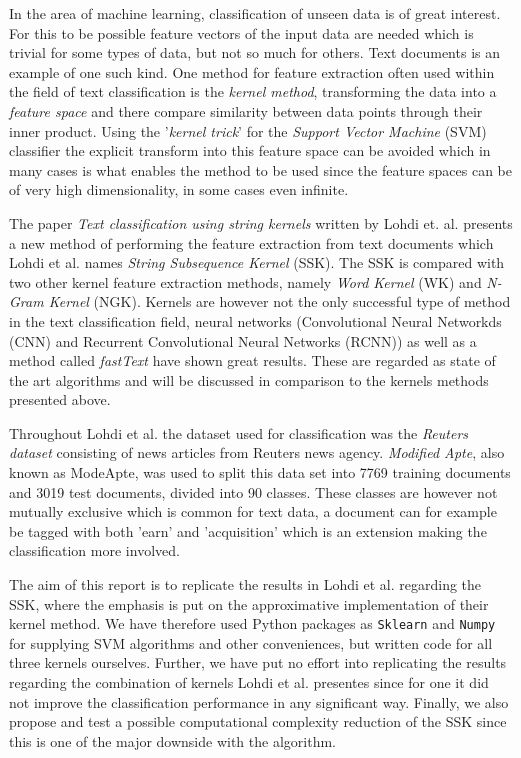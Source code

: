 
In the area of machine learning, classification of unseen data is of great interest. For this to be possible feature vectors of the input data are needed which is trivial for some types of data, but not so much for others. Text documents is an example of one such kind. One method for feature extraction often used within the field of text classification is the \textit{kernel method}, transforming the data into a \textit{feature space} and there compare similarity between data points through their inner product. Using the '\textit{kernel trick}' for the \textit{Support Vector Machine} (SVM) classifier the explicit transform into this feature space can be avoided which in many cases is what enables the method to be used since the feature spaces can be of very high dimensionality, in some cases even infinite. 

The paper \textit{Text classification using string kernels} written by Lohdi et. al. presents a new method of performing the feature extraction from text documents which Lohdi et al. names \textit{String Subsequence Kernel} (SSK). The SSK is compared with two other kernel feature extraction methods, namely \textit{Word Kernel} (WK) and \textit{N-Gram Kernel} (NGK). Kernels are however not the only successful type of method in the text classification field, neural networks (Convolutional Neural Networkds (CNN) and Recurrent Convolutional Neural Networks (RCNN)) as well as a method called \textit{fastText} have shown great results. These are regarded as state of the art algorithms and will be discussed in comparison to the kernels methods presented above. 

Throughout Lohdi et al. the dataset used for classification was the \textit{Reuters dataset} consisting of news articles from Reuters news agency. \textit{Modified Apte}, also known as ModeApte, was used to split this data set into 7769 training documents and 3019 test documents, divided into 90 classes. These classes are however not mutually exclusive which is common for text data, a document can for example be tagged with both 'earn' and 'acquisition' which is an extension making the classification more involved.

The aim of this report is to replicate the results in Lohdi et al. regarding the SSK, where the emphasis is put on the approximative implementation of their kernel method. We have therefore used Python packages as \texttt{Sklearn} and \texttt{Numpy} for supplying SVM algorithms and other conveniences, but written code for all three kernels ourselves. Further, we have put no effort into replicating the results regarding the combination of kernels Lohdi et al. presentes since for one it did not improve the classification performance in any significant way. Finally, we also propose and test a possible computational complexity reduction of the SSK since this is one of the major downside with the algorithm.

